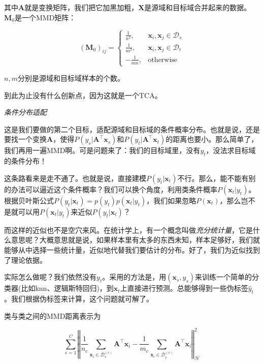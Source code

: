 其中$\mathbf{A}$就是变换矩阵，我们把它加黑加粗，$\mathbf{X}$是源域和目标域合并起来的数据。$\mathbf{M}_0$是一个MMD矩阵：

\begin{equation}
	(\mathbf{M}_0)_{ij}=\begin{cases} \frac{1}{n^2}, & \mathbf{x}_i,\mathbf{x}_j \in \mathcal{D}_s\\ \frac{1}{m^2}, & \mathbf{x}_i,\mathbf{x}_j \in \mathcal{D}_t\\ -\frac{1}{mn}, & \text{otherwise} \end{cases}
\end{equation}

$n,m$分别是源域和目标域样本的个数。

到此为止没有什么创新点，因为这就是一个TCA。

\textit{条件分布适配}

这是我们要做的第二个目标，适配源域和目标域的条件概率分布。也就是说，还是要找一个变换$\mathbf{A}$，使得$P(y_s|\mathbf{A}^\top \mathbf{x}_s)$和$P(y_t|\mathbf{A}^\top \mathbf{x}_t)$的距离也要小。那么简单了，我们再用一遍MMD啊。可是问题来了：我们的目标域里，没有$y_t$，没法求目标域的条件分布！

这条路看来是走不通了。也就是说，直接建模$P(y_t|\mathbf{x}_t)$不行。那么，能不能有别的办法可以逼近这个条件概率？我们可以换个角度，利用类条件概率$P(\mathbf{x}_t|y_t)$。根据贝叶斯公式$P(y_t|\mathbf{x}_t)=p(y_t)p(\mathbf{x}_t|y_t)$，我们如果忽略$P(\mathbf{x}_t)$，那么岂不是就可以用$P(\mathbf{x}_t|y_t)$来近似$P(y_t|\mathbf{x}_t)$？

而这样的近似也不是空穴来风。在统计学上，有一个概念叫做\textit{充分统计量}，它是什么意思呢？大概意思就是说，如果样本里有太多的东西未知，样本足够好，我们就能够从中选择一些统计量，近似地代替我们要估计的分布。好了，我们为近似找到了理论依据。

实际怎么做呢？我们依然没有$y_t$。采用的方法是，用$(\mathbf{x}_s,y_s)$来训练一个简单的分类器(比如knn、逻辑斯特回归)，到$\mathbf{x}_t$上直接进行预测。总能够得到一些伪标签$\hat{y}_t$。我们根据伪标签来计算，这个问题就可解了。

类与类之间的MMD距离表示为

\begin{equation}
	\sum_{c=1}^{C}\left \Vert \frac{1}{n_c} \sum_{\mathbf{x}_{i} \in \mathcal{D}^{(c)}_s} \mathbf{A}^\top \mathbf{x}_{i} - \frac{1}{m_c} \sum_{\mathbf{x}_{i} \in \mathcal{D}^{(c)}_t} \mathbf{A}^\top \mathbf{x}_{i} \right \Vert ^2_\mathcal{H}
\end{equation}

